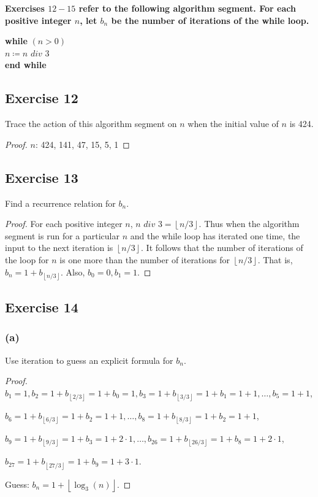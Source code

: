 \documentclass[14pt]{extarticle}
\newcommand{\cy}{\color{cyan}}
\newcommand{\floor}[1]{{\left\lfloor#1\right\rfloor}}
\begin{document}
{\bf \cy Exercises \(12-15\) refer to the following algorithm segment. For each positive integer \(n\), let \(b_n\) be the
number of iterations of the while loop.
\begin{center}
    {\bf while} \((n > 0)\) \\
    \hspace{2cm} \(n \coloneqq n \,\, div \,\, 3\) \\
    {\bf end while}
\end{center}
}

\subsection{Exercise 12}
Trace the action of this algorithm segment on \(n\) when the initial value of \(n\) is 424.

\begin{proof}
    \(n\): 424, 141, 47, 15, 5, 1
\end{proof}

\subsection{Exercise 13}
Find a recurrence relation for \(b_n\).

\begin{proof}
    For each positive integer \(n\), \(n \,\,div\,\, 3 = \floor{n/3}\). Thus when the algorithm segment is run for a particular
    \(n\) and the while loop has iterated one time, the input to the next iteration is \(\floor{n/3}\). It follows that the
    number of iterations of the loop for \(n\) is one more than the number of iterations for \(\floor{n/3}\). That is,
    \(b_n = 1 + b_{\floor{n/3}}\). Also, \(b_0 = 0, b_1 = 1\).
\end{proof}

\subsection{Exercise 14}
\subsubsection{(a)}
Use iteration to guess an explicit formula for \(b_n\).

\begin{proof}
    \(b_1 = 1, b_2 = 1 + b_{\floor{2/3}} = 1 + b_0 = 1, b_3 = 1 + b_{\floor{3/3}} = 1 + b_1 = 1 + 1, \ldots, b_5 = 1+1\),

    \(b_6 = 1 + b_{\floor{6/3}} = 1 + b_2 = 1 + 1, \ldots, b_8 = 1 + b_{\floor{8/3}} = 1 + b_2 = 1 + 1\),

    \(b_9 = 1 + b_{\floor{9/3}} = 1 + b_3 = 1 + 2 \cdot 1, \ldots, b_{26} = 1 + b_{\floor{26/3}} = 1 + b_8 = 1 + 2 \cdot 1\),

    \(b_{27} = 1 + b_{\floor{27/3}} = 1 + b_9 = 1 + 3 \cdot 1\).

    Guess: \(b_n = 1 + \floor{\log_3(n)}\).
\end{proof}
\end{document}
